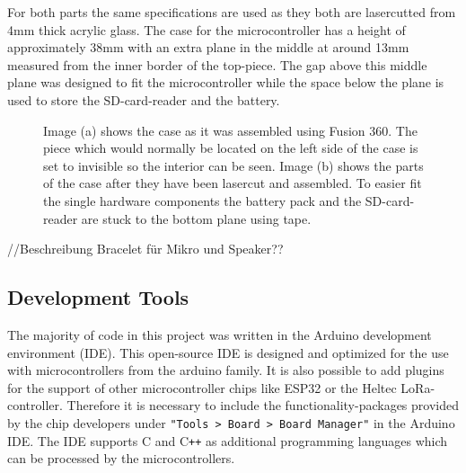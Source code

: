For both parts the same specifications are used as they both are lasercutted from 4mm thick acrylic glass.
The case for the microcontroller has a height of approximately 38mm with an extra plane in the middle at around 13mm measured from the inner border of the top-piece.
The gap above this middle plane was designed to fit the microcontroller while the space below the plane is used to store the SD-card-reader and the battery.
\begin{figure}
	\begin{center}
		\hspace{0.5cm}
	\end{center}
	\caption{Image (a) shows the case as it was assembled using Fusion 360. The piece which would normally be located on the left side of the case is set to invisible so the interior can be seen.
	Image (b) shows the parts of the case after they have been lasercut and assembled. To easier fit the single hardware components the battery pack and the SD-card-reader are stuck to the bottom plane using tape.}
	\label{fig:cad_designs}
\end{figure}

//Beschreibung Bracelet für Mikro und Speaker??

\subsection{Development Tools}
The majority of code in this project was written in the Arduino development environment (IDE). 
This open-source IDE is designed and optimized for the use with microcontrollers from the arduino family.
It is also possible to add plugins for the support of other microcontroller chips like ESP32 or the Heltec LoRa-controller.
Therefore it is necessary to include the functionality-packages provided by the chip developers under \texttt{"Tools > Board > Board Manager"} in the Arduino IDE.
The IDE supports C and C\texttt{++} as additional programming languages which can be processed by the microcontrollers.

